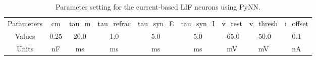 \documentclass[runningheads,a4paper]{llncs}
\begin{document}
	\begin{table}[bt]
		\centering
		\caption{\label{tbl:pynnSetting}Parameter setting for the current-based LIF neurons using PyNN.}
		\bgroup
		\def\arraystretch{1.4}
		\begin{tabular}{c|| c |c| c| c| c| c| c| c}
			\hline
			Parameters & cm & tau\_m & tau\_refrac & tau\_syn\_E & tau\_syn\_I & v\_rest & v\_thresh & i\_offset \\
			Values & 0.25 &  20.0 & 1.0 & 5.0 & 5.0 & -65.0 & -50.0  & 0.1 \\
			Units & nF & ms & ms & ms & ms & mV & mV& nA\\
			\hline
		\end{tabular}
		\egroup
	\end{table}
	
	
	
\end{document}
